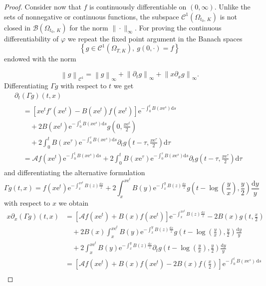 \documentclass[10pt]{amsart}
\theoremstyle{definition}\newtheorem{defi}[theo]{Definition}\newtheorem{rema}[theo]{Remark}\newtheorem{exam}[theo]{Example}\newtheorem{exem}[theo]{Example}\newtheorem{nota}[theo]{Notation}
\newcommand{\p}{\partial}
\newcommand{\Cr}{\mathcal{C}}
\newcommand{\A}{\mathcal{A}}
\newcommand{\B}{\mathcal{B}}
\newcommand{\f}{\frac}
\newcommand{\1}{\mathds{1}}
\newcommand{\e}{\mathrm{e}}
\renewcommand{\d}{\mathrm{d}}
\begin{document}
\begin{proof}

Consider now that $f$ is continuously differentiable on $(0,\infty).$ Unlike the sets of nonnegative or continuous functions, the subspace $\Cr^1(\Omega_{t_0,\,K})$ is not closed in $\B(\Omega_{t_0,\,K})$ for the norm $\|\cdot\|_\infty.$ For proving the continuous differentiability of $\varphi$ we repeat the fixed point argument in the Banach spaces
\[
\left\{g\in \Cr^1\left(\Omega_{T,K}\right),\ g(0,\cdot)=f\right\}
\]
endowed with the norm

\[
\left\|g\right\|_{\Cr^1}=\left\|g\right\|_\infty+\left\|\partial_tg\right\|_\infty+\left\|x\partial_xg\right\|_\infty.
\]
Differentiating $\Gamma g$ with respect to $t$ we get
\begin{multline}\label{eq:dtGammag}
\p_t(\Gamma g)(t,x)\\
\begin{aligned}
&=\left[x\e^tf'\left(x\e^t\right) - B\left(x\e^t\right)f\left(x\e^t\right)\right]\e^{-\int_0^t B\left(x\e^s\right)\d s}\\
&\quad+ 2B\left(x\e^t\right)\e^{-\int_0^t B\left(x\e^s\right)\d s}g\left(0,\frac{x\e^t}{2}\right)\\
&\quad + 2\int_0^t B\left(x\e^\tau\right)\e^{-\int_0^\tau B\left(x\e^s\right)\d s} \p_t g\left(t-\tau,\frac{x\e^\tau}{2}\right)\d \tau\\
&=\A f\left(x\e^t\right)\e^{-\int_0^t B\left(x\e^s\right)\d s} + 2\int_0^t B\left(x\e^\tau\right)\e^{-\int_0^\tau B\left(x\e^s\right)\d s} \p_t g\left(t-\tau,\frac{x\e^\tau}{2}\right)\d \tau 
\end{aligned}
\end{multline}
and differentiating the alternative formulation
\[
\Gamma g(t,x)=f\left(x\e^t\right)\e^{-\int_x^{x\e^t} B(z)\frac{\d z}{z}} + 2\int_x^{x\e^t} B(y)\e^{-\int_x^y B(z)\f{\d z}{z}}g\left(t-\log\left(\frac{y}{x}\right),\frac{y}{2}\right) \f{\d y}{y}
\]
with respect to $x$ we obtain
\begin{align*}
x\partial_x(\Gamma g)(t,x)&=\left[\A f\left(x\e^t\right)+B(x)f\left(x\e^t\right)\right]\e^{-\int_x^{x\e^t} B(z)\frac{\d z}{z}}-2B(x)g\left(t,\frac x2\right)\\
&\quad+2B(x)\int_x^{x\e^t} B(y)\e^{-\int_x^y B(z)\f{\d z}{z}}g\left(t-\log\left(\frac{y}{x}\right),\frac{y}{2}\right) \f{\d y}{y}\\
&\quad+2\int_x^{x\e^t} B(y)\e^{-\int_x^y B(z)\f{\d z}{z}}\partial_tg\left(t-\log\left(\frac{y}{x}\right),\frac{y}{2}\right) \f{\d y}{y}\\
&=\left[\A f\left(x\e^t\right)+B(x)f\left(x\e^t\right)-2B(x)f\left(\frac x2\right)\right]\e^{-\int_0^t B\left(x\e^s\right)\,\d s}\\

\end{align*}
\end{proof}
\end{document}
